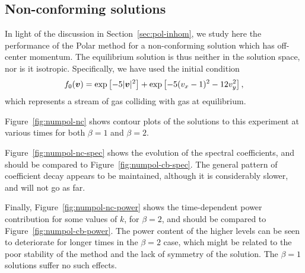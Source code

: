 \subsection{Non-conforming solutions} \label{sec:nonconf}

In light of the discussion in Section~\vref{sec:pol-inhom}, we study here the performance of the Polar method
for a non-conforming solution which has off-center momentum. The equilibrium solution is thus neither in the
solution space, nor is it isotropic. Specifically, we have used the initial condition
\[
    f_0({\bm v}) = \exp\left[-5|{\bm v}|^2\right] + \exp\left[-5(v_x-1)^2-12v_y^2\right],
\]
which represents a stream of gas colliding with gas at equilibrium.

Figure~\vref{fig:numpol-nc} shows contour plots of the solutions to this experiment at various times for both
$\beta=1$ and $\beta=2$.

Figure~\vref{fig:numpol-nc-spec} shows the evolution of the spectral coefficients, and should be compared to
Figure~\vref{fig:numpol-cb-spec}. The general pattern of coefficient decay appears to be maintained, although
it is considerably slower, and will not go as far.

Finally, Figure~\vref{fig:numpol-nc-power} shows the time-dependent power contribution for some values of $k$,
for $\beta=2$, and should be compared to Figure~\vref{fig:numpol-cb-power}. The power content of the higher
levels can be seen to deteriorate for longer times in the $\beta=2$ case, which might be related to the poor
stability of the method and the lack of symmetry of the solution. The $\beta=1$ solutions suffer no such
effects.

